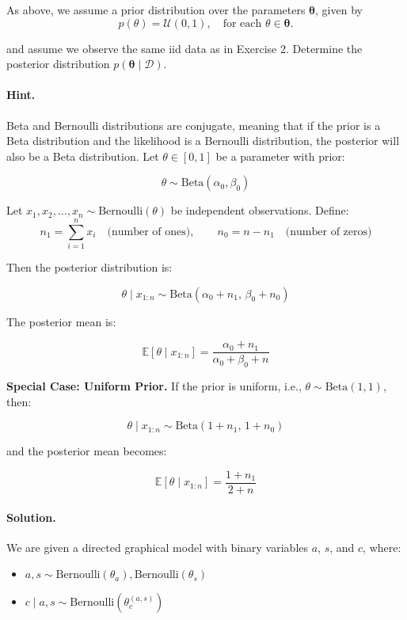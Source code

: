 \documentclass[11pt]{article}
\newif\ifshowanswers
\begin{document}
As above, we assume a prior distribution over the parameters $\bm{\theta}$, given by
\[
  p(\theta) = \mathcal{U}(0, 1), \quad \text{for each } \theta \in \bm{\theta}.
\]

\noindent
and assume we observe the same iid data as in Exercise 2.
\noindent
Determine the posterior distribution $p(\bm{\theta} \mid \mathcal{D})$.


\paragraph{Hint.}
Beta and Bernoulli distributions are conjugate, meaning that if the prior is a Beta distribution and the likelihood is a Bernoulli distribution, the posterior will also be a Beta distribution.
Let \(\theta \in [0, 1]\) be a parameter with prior:

\[
\theta \sim \text{Beta}(\alpha_0, \beta_0)
\]

\noindent
Let \(x_1, x_2, \dots, x_n \sim \text{Bernoulli}(\theta)\) be independent observations.
Define:
\[
n_1 = \sum_{i=1}^n x_i \quad \text{(number of ones)}, \qquad n_0 = n - n_1 \quad \text{(number of zeros)}
\]

\noindent
Then the posterior distribution is:

\[
\boxed{
\theta \mid x_{1:n} \sim \text{Beta}(\alpha_0 + n_1, \, \beta_0 + n_0)
}
\]

\noindent
The posterior mean is:

\[
\boxed{
\mathbb{E}[\theta \mid x_{1:n}] = \frac{\alpha_0 + n_1}{\alpha_0 + \beta_0 + n}
}
\]

\noindent
\textbf{Special Case: Uniform Prior.}
If the prior is uniform, i.e., \(\theta \sim \text{Beta}(1, 1)\), then:

\[
\theta \mid x_{1:n} \sim \text{Beta}(1 + n_1, \, 1 + n_0)
\]

\noindent
and the posterior mean becomes:

\[
\boxed{
\mathbb{E}[\theta \mid x_{1:n}] = \frac{1 + n_1}{2 + n}
}
\]

\ifshowanswers
  \paragraph{Solution.}

We are given a directed graphical model with binary variables \(a\), \(s\), and \(c\), where:

\begin{itemize}
  \item \(a, s \sim \text{Bernoulli}(\theta_a), \text{Bernoulli}(\theta_s)\)
  \item \(c \mid a, s \sim \text{Bernoulli}(\theta_c^{(a,s)})\)
\end{itemize}
\end{document}
